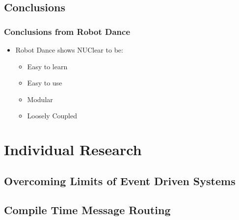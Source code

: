 \documentclass{beamer}
\begin{document}
	\subsection{Conclusions} %
	\begin{frame}
		\frametitle{Conclusions from Robot Dance}
			\begin{itemize}
				\item Robot Dance shows NUClear to be:
				\begin{itemize}
					\item Easy to learn
					\item Easy to use
					\item Modular
					\item Loosely Coupled
				\end{itemize}
			\end{itemize}
	\end{frame}	
	
\begin{frame}
\end{frame}

\section{Individual Research}
\begin{frame}
	\sectionpage
\end{frame}

	\subsection{Overcoming Limits of Event Driven Systems}
	\begin{frame}
		\subsectionpage
	\end{frame}
	
	\subsection{Compile Time Message Routing}
	\begin{frame}
		\subsectionpage
	\end{frame}
	
\end{document}
